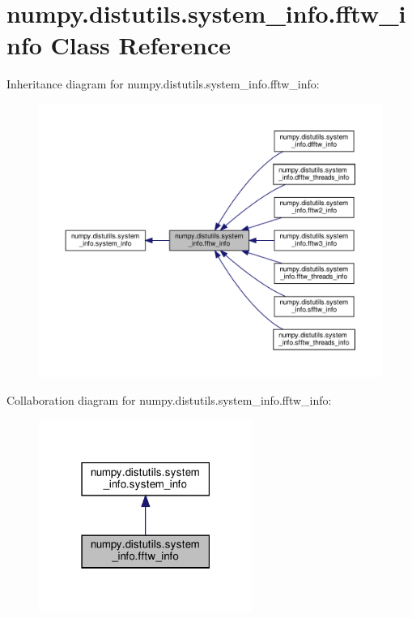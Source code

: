 \hypertarget{classnumpy_1_1distutils_1_1system__info_1_1fftw__info}{}\section{numpy.\+distutils.\+system\+\_\+info.\+fftw\+\_\+info Class Reference}
\label{classnumpy_1_1distutils_1_1system__info_1_1fftw__info}


Inheritance diagram for numpy.\+distutils.\+system\+\_\+info.\+fftw\+\_\+info\+:
\nopagebreak
\begin{figure}[H]
\begin{center}
\leavevmode
\includegraphics[width=350pt]{classnumpy_1_1distutils_1_1system__info_1_1fftw__info__inherit__graph}
\end{center}
\end{figure}


Collaboration diagram for numpy.\+distutils.\+system\+\_\+info.\+fftw\+\_\+info\+:
\nopagebreak
\begin{figure}[H]
\begin{center}
\leavevmode
\includegraphics[width=198pt]{classnumpy_1_1distutils_1_1system__info_1_1fftw__info__coll__graph}
\end{center}
\end{figure}
